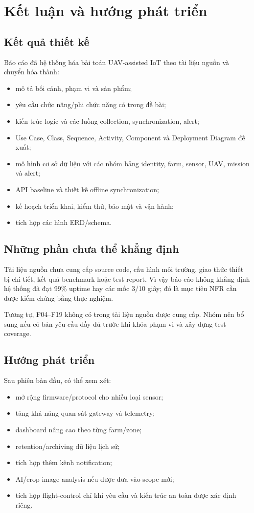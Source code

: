 
\chapter{Kết luận và hướng phát triển}

\section{Kết quả thiết kế}
Báo cáo đã hệ thống hóa bài toán UAV-assisted IoT theo tài liệu nguồn và chuyển hóa thành:
\begin{itemize}
  \item mô tả bối cảnh, phạm vi và sản phẩm;
  \item yêu cầu chức năng/phi chức năng có trong đề bài;
  \item kiến trúc logic và các luồng collection, synchronization, alert;
  \item Use Case, Class, Sequence, Activity, Component và Deployment Diagram đề xuất;
  \item mô hình cơ sở dữ liệu với các nhóm bảng identity, farm, sensor, UAV, mission và alert;
  \item API baseline và thiết kế offline synchronization;
  \item kế hoạch triển khai, kiểm thử, bảo mật và vận hành;
  \item tích hợp các hình ERD/schema.
\end{itemize}

\section{Những phần chưa thể khẳng định}
Tài liệu nguồn chưa cung cấp source code, cấu hình môi trường, giao thức thiết bị chi tiết, kết quả benchmark hoặc test report. Vì vậy báo cáo không khẳng định hệ thống đã đạt 99\% uptime hay các mốc 3/10 giây; đó là mục tiêu NFR cần được kiểm chứng bằng thực nghiệm.

Tương tự, F04--F19 không có trong tài liệu nguồn được cung cấp. Nhóm nên bổ sung nếu có bản yêu cầu đầy đủ trước khi khóa phạm vi và xây dựng test coverage.

\section{Hướng phát triển}
Sau phiên bản đầu, có thể xem xét:
\begin{itemize}
  \item mở rộng firmware/protocol cho nhiều loại sensor;
  \item tăng khả năng quan sát gateway và telemetry;
  \item dashboard nâng cao theo từng farm/zone;
  \item retention/archiving dữ liệu lịch sử;
  \item tích hợp thêm kênh notification;
  \item AI/crop image analysis nếu được đưa vào scope mới;
  \item tích hợp flight-control chỉ khi yêu cầu và kiến trúc an toàn được xác định riêng.
\end{itemize}

